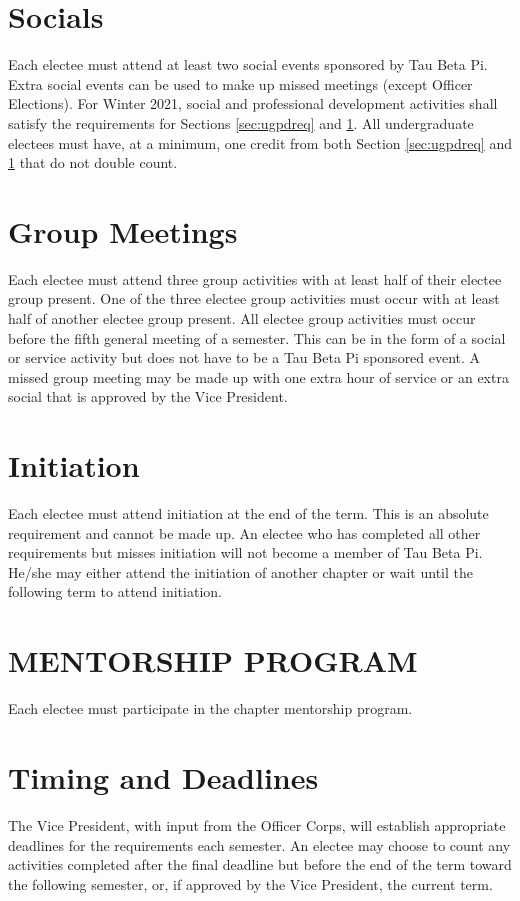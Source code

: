 \section{Socials}\label{sec:ugsocialreq} Each electee must attend at least two social events sponsored by Tau Beta Pi. Extra social  events can be used to make up missed meetings (except Officer Elections). For Winter 2021, social and professional development activities shall satisfy the requirements for Sections \ref{sec:ugpdreq} and \ref{sec:ugsocialreq}. All undergraduate electees must have, at a minimum, one credit from both Section \ref{sec:ugpdreq} and \ref{sec:ugsocialreq} that do not double count.
\section{Group Meetings} \label{group_meetings} Each electee must attend three group activities with at least half of their electee group present. One of the three electee group activities must occur with at least half of another electee group present. All electee group activities must occur before the fifth general meeting of a semester.  This can be in the form of a social or service activity but does not have to be a Tau Beta Pi sponsored event. A missed group meeting may be made up with one extra hour of service or an extra social that is approved by the Vice President.
\section{Initiation} Each electee must attend initiation at the end of the term. This is an absolute requirement and cannot be made up. An electee who has completed all other requirements but misses initiation will not become a member of Tau Beta Pi. He/she may either attend the initiation of another chapter or wait until the following term to attend initiation.
\section{MENTORSHIP PROGRAM} Each electee must participate in the chapter mentorship program. %

\section{Timing and Deadlines}  The Vice President, with input from the Officer Corps, will establish appropriate deadlines for the requirements each semester. An electee may choose to count any activities completed after the final deadline but before the end of the term toward the following semester, or, if approved by the Vice President, the current term.

